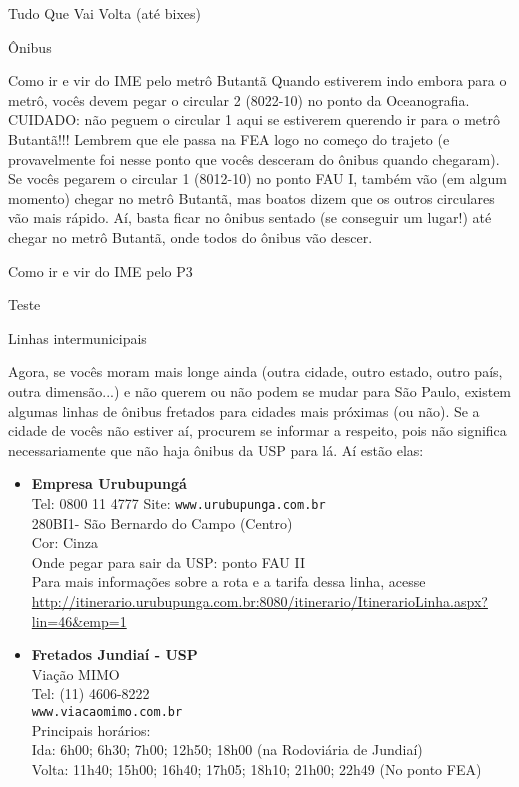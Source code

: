 \begin{secao}{Tudo Que Vai Volta (até bixes)}
\begin{subsecao}{Ônibus}
\begin{subsubsecao}{Como ir e vir do IME pelo metrô Butantã}
Quando estiverem indo embora para o metrô, vocês devem pegar o circular 2
(8022-10) no ponto da Oceanografia. CUIDADO: não peguem o circular 1 aqui
se estiverem querendo ir para o metrô Butantã!!! Lembrem que ele passa na
FEA logo no começo do trajeto (e provavelmente foi nesse ponto que vocês
desceram do ônibus quando chegaram). Se vocês pegarem o circular 1 (8012-10)
no ponto FAU I, também vão (em algum momento) chegar no metrô Butantã, mas
boatos dizem que os outros circulares vão mais rápido. Aí, basta ficar no
ônibus sentado (se conseguir um lugar!) até chegar no metrô Butantã, onde 
todos do ônibus vão descer.

\end{subsubsecao}

\begin{subsubsecao}{Como ir e vir do IME pelo P3}

Teste

\end{subsubsecao}

\begin{subsubsecao}{Linhas intermunicipais}

Agora, se vocês moram mais longe ainda (outra cidade, outro estado, outro país,
outra dimensão...) e não querem ou não podem se mudar para São Paulo, existem
algumas linhas de ônibus fretados para cidades mais próximas (ou não). Se a
cidade de vocês não estiver aí, procurem se informar a respeito, pois não
significa necessariamente que não haja ônibus da USP para lá. Aí estão elas:

\begin{itemize}
  \item {\bf Empresa Urubupungá}\\
    Tel: 0800 11 4777
    Site: {\tt www.urubupunga.com.br}\\
    280BI1- São Bernardo do Campo (Centro)\\
    Cor: Cinza\\
    Onde pegar para sair da USP: ponto FAU II\\
    Para mais informações sobre a rota e a tarifa dessa linha, acesse
    \url{http://itinerario.urubupunga.com.br:8080/itinerario/ItinerarioLinha.aspx?lin=46\&emp=1}

  \item {\bf Fretados Jundiaí - USP}\\
    Viação MIMO\\
    Tel: (11) 4606-8222\\
    {\tt www.viacaomimo.com.br}\\
    Principais horários:\\
    Ida: 6h00; 6h30; 7h00; 12h50; 18h00 (na Rodoviária de Jundiaí)\\
    Volta: 11h40; 15h00; 16h40; 17h05; 18h10; 21h00; 22h49 (No ponto FEA)


\end{itemize}
\end{subsubsecao}
\end{subsecao}
\end{secao}
